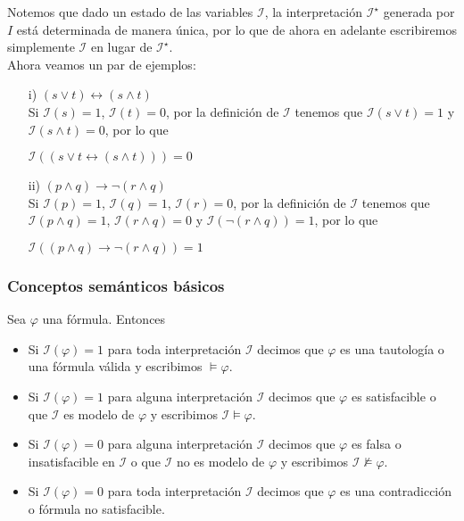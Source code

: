 \documentclass[letterpaper,11pt]{article}
\begin{document}
    \newpage
    Notemos que dado un estado de las variables $\mathcal{I}$, la 
    interpretación $\mathcal{I^{\star}}$ generada por $I$ está 
    determinada de manera única, por lo que de ahora en adelante
    escribiremos simplemente $\mathcal{I}$ en lugar de $\mathcal{I^{\star}}$.\\
    Ahora veamos un par de ejemplos:
    \begin{itemize}
        \item[i)] $(s \lor t) \leftrightarrow (s \land t)$ \\
        Si $\mathcal{I}(s) = 1$, $\mathcal{I}(t) = 0$, por la definición 
        de $\mathcal{I}$ tenemos que 
        $\mathcal{I}(s \lor t) = 1$ y $\mathcal{I}(s \land t) = 0$,
        por lo que 
        \begin{center}
            $\mathcal{I}((s \lor t \leftrightarrow (s \land t))) = 0$
        \end{center}

        \item[ii)] $(p \land q) \rightarrow \neg (r \land q)$ \\
        Si $\mathcal{I}(p) = 1$, $\mathcal{I}(q) = 1$, $\mathcal{I}(r) = 0$,
        por la definición de $\mathcal{I}$ tenemos que  
        $\mathcal{I}(p \land q) = 1$, $\mathcal{I}(r \land q) = 0$ y
        $\mathcal{I}(\neg (r \land q)) = 1$, por lo que
        \begin{center}
            $\mathcal{I}((p \land q) \rightarrow \neg (r \land q)) = 1$
        \end{center}
    \end{itemize}

    \subsubsection{Conceptos semánticos básicos}
    \begin{teo}
        Sea $\varphi$ una fórmula. Entonces 
        \begin{itemize}
            \item Si $\mathcal{I}(\varphi) = 1$ para toda interpretación 
            $\mathcal{I}$ decimos que $\varphi$ es una tautología o una 
            fórmula válida y escribimos $\models \varphi$. 
            \item Si $\mathcal{I}(\varphi) = 1$ para alguna interpretación
            $\mathcal{I}$ decimos que $\varphi$ es satisfacible o que
            $\mathcal{I}$ es modelo de $\varphi$ y escribimos 
            $\mathcal{I} \models \varphi$.
            \item Si $\mathcal{I}(\varphi) = 0$ para alguna interpretación
            $\mathcal{I}$ decimos que $\varphi$ es falsa o insatisfacible
            en $\mathcal{I}$ o que $\mathcal{I}$ no es modelo de $\varphi$
            y escribimos $\mathcal{I} \not \models \varphi$.  
            \item Si $\mathcal{I}(\varphi) = 0$ para toda interpretación
            $\mathcal{I}$ decimos que $\varphi$ es una contradicción o fórmula
            no satisfacible. 
        \end{itemize}
    \end{teo}
\end{document}
